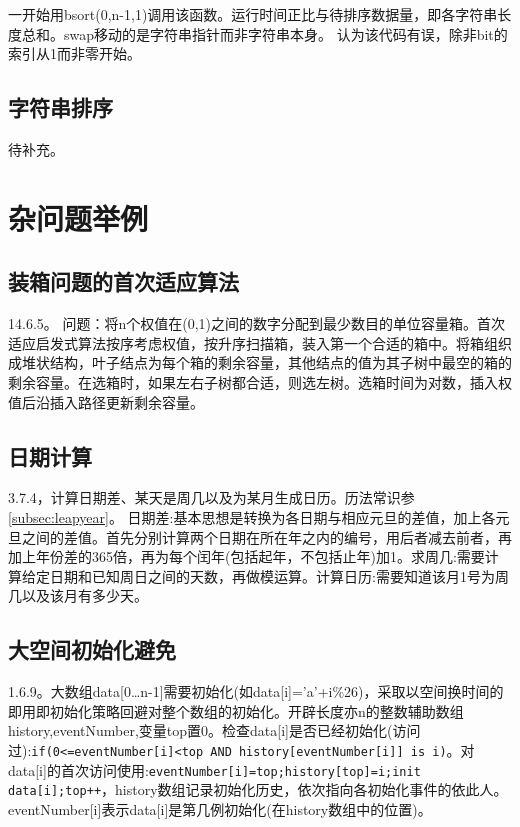 一开始用bsort(0,n-1,1)调用该函数。运行时间正比与待排序数据量，即各字符串长度总和。swap移动的是字符串指针而非字符串本身。 \cite{self}认为该代码有误，除非bit的索引从1而非零开始。

\subsection{字符串排序}
\cite{self}待补充。




\section{杂问题举例}

\subsection{装箱问题的首次适应算法}
\cite{pp}14.6.5。
问题：将n个权值在(0,1)之间的数字分配到最少数目的单位容量箱。首次适应启发式算法按序考虑权值，按升序扫描箱，装入第一个合适的箱中。将箱组织成堆状结构，叶子结点为每个箱的剩余容量，其他结点的值为其子树中最空的箱的剩余容量。在选箱时，如果左右子树都合适，则选左树。选箱时间为对数，插入权值后沿插入路径更新剩余容量。

\subsection{日期计算}
\cite{pp}3.7.4，计算日期差、某天是周几以及为某月生成日历。历法常识参\ref{subsec:leapyear}。
日期差:基本思想是转换为各日期与相应元旦的差值，加上各元旦之间的差值。首先分别计算两个日期在所在年之内的编号，用后者减去前者，再加上年份差的365倍，再为每个闰年(包括起年，不包括止年)加1。求周几:需要计算给定日期和已知周日之间的天数，再做模运算。计算日历:需要知道该月1号为周几以及该月有多少天。

\subsection{大空间初始化避免}
\cite{pp}1.6.9。大数组data[0\dots n-1]需要初始化(如data[i]='a'+i\%26)，采取以空间换时间的即用即初始化策略回避对整个数组的初始化。开辟长度亦n的整数辅助数组history,eventNumber,变量top置0。检查data[i]是否已经初始化(访问过):\verb|if(0<=eventNumber[i]<top AND history[eventNumber[i]] is i)|。对data[i]的首次访问使用:\verb|eventNumber[i]=top;history[top]=i;init data[i];top++|，history数组记录初始化历史，依次指向各初始化事件的依此人。eventNumber[i]表示data[i]是第几例初始化(在history数组中的位置)。\label{problem:removeInit}

